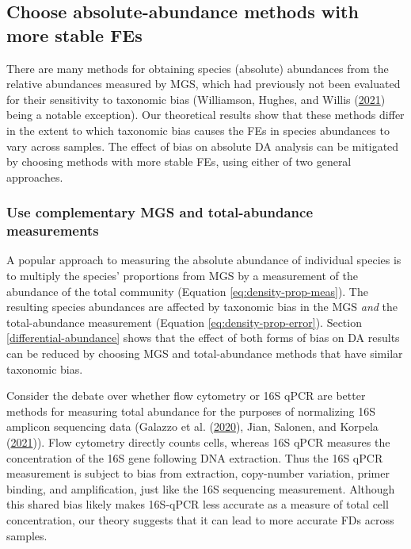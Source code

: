 \documentclass[
]{article}
\begin{document}
\hypertarget{choose-absolute-abundance-methods-with-more-stable-fes}{%
\subsection{Choose absolute-abundance methods with more stable FEs}\label{choose-absolute-abundance-methods-with-more-stable-fes}}

There are many methods for obtaining species (absolute) abundances from the relative abundances measured by MGS, which had previously not been evaluated for their sensitivity to taxonomic bias (Williamson, Hughes, and Willis (\protect\hyperlink{ref-williamson2021amul}{2021}) being a notable exception).
Our theoretical results show that these methods differ in the extent to which taxonomic bias causes the FEs in species abundances to vary across samples.
The effect of bias on absolute DA analysis can be mitigated by choosing methods with more stable FEs, using either of two general approaches.

\hypertarget{use-complementary-mgs-and-total-abundance-measurements}{%
\subsubsection{Use complementary MGS and total-abundance measurements}\label{use-complementary-mgs-and-total-abundance-measurements}}

A popular approach to measuring the absolute abundance of individual species is to multiply the species' proportions from MGS by a measurement of the abundance of the total community (Equation \eqref{eq:density-prop-meas}).
The resulting species abundances are affected by taxonomic bias in the MGS \emph{and} the total-abundance measurement (Equation \eqref{eq:density-prop-error}).
Section \ref{differential-abundance} shows that the effect of both forms of bias on DA results can be reduced by choosing MGS and total-abundance methods that have similar taxonomic bias.

Consider the debate over whether flow cytometry or 16S qPCR are better methods for measuring total abundance for the purposes of normalizing 16S amplicon sequencing data (Galazzo et al. (\protect\hyperlink{ref-galazzo2020howt}{2020}), Jian, Salonen, and Korpela (\protect\hyperlink{ref-jian2021comm}{2021})).
Flow cytometry directly counts cells, whereas 16S qPCR measures the concentration of the 16S gene following DNA extraction.
Thus the 16S qPCR measurement is subject to bias from extraction, copy-number variation, primer binding, and amplification, just like the 16S sequencing measurement.
Although this shared bias likely makes 16S-qPCR less accurate as a measure of total cell concentration, our theory suggests that it can lead to more accurate FDs across samples.
\end{document}
